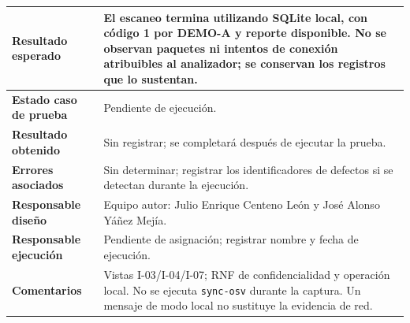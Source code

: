 \begin{table}[H]
\begin{tabularx}{\textwidth}{|P{4.15cm}|Y|}
\textbf{Resultado esperado} & El escaneo termina utilizando SQLite local, con código 1 por DEMO-A y reporte disponible. No se observan paquetes ni intentos de conexión atribuibles al analizador; se conservan los registros que lo sustentan. \\ \hline
\textbf{Estado caso de prueba} & Pendiente de ejecución. \\ \hline
\textbf{Resultado obtenido} & Sin registrar; se completará después de ejecutar la prueba. \\ \hline
\textbf{Errores asociados} & Sin determinar; registrar los identificadores de defectos si se detectan durante la ejecución. \\ \hline
\textbf{Responsable diseño} & Equipo autor: Julio Enrique Centeno León y José Alonso Yáñez Mejía. \\ \hline
\textbf{Responsable ejecución} & Pendiente de asignación; registrar nombre y fecha de ejecución. \\ \hline
\textbf{Comentarios} & Vistas I-03/I-04/I-07; RNF de confidencialidad y operación local. No se ejecuta \texttt{sync-\allowbreak osv} durante la captura. Un mensaje de modo local no sustituye la evidencia de red. \\ \hline
\end{tabularx}
\end{table}
\clearpage
